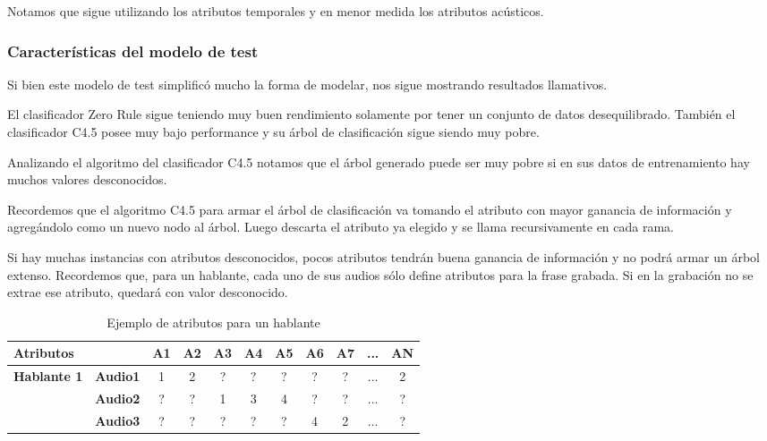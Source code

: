 Notamos que sigue utilizando los atributos temporales y en menor medida los atributos acústicos.


\subsubsection{Características del modelo de test}

Si bien este modelo de test simplificó mucho la forma de modelar, nos sigue mostrando resultados llamativos. 

El clasificador Zero Rule sigue teniendo muy buen rendimiento solamente por tener un conjunto de datos desequilibrado. También el clasificador C4.5 posee muy bajo performance y su árbol de clasificación sigue siendo muy pobre.  

Analizando el algoritmo del clasificador C4.5 notamos que el árbol generado puede ser muy pobre si en sus datos de entrenamiento hay muchos valores desconocidos. 

Recordemos que el algoritmo C4.5 para armar el árbol de clasificación va tomando el atributo con mayor ganancia de información y agregándolo como un nuevo nodo al árbol. Luego descarta el atributo ya elegido y se llama recursivamente en cada rama. 

Si hay muchas instancias con atributos desconocidos, pocos atributos tendrán buena ganancia de información y no podrá armar un árbol extenso. Recordemos que, para un hablante, cada uno de sus audios sólo define atributos para la frase grabada. Si en la grabación no se extrae ese atributo, quedará con valor desconocido. 

\begin{table}[H]
	\centering
	\begin{tabular}{|l|l|ccccccccc|}
		\hline
		\multicolumn{2}{|l|}{Atributos} & A1 & A2 & A3 & A4 & A5 & A6 & A7 & ... & AN \\
		\hline 
		\textbf{Hablante 1} & \textbf{Audio1} & 1 & 2 & ? & ? & ? & ? & ? & ... & 2 \\
		& \textbf{Audio2} & ? & ? & 1 & 3 & 4 & ? & ? & ... & ? \\
		& \textbf{Audio3} & ? & ? & ? & ? & ? & 4 & 2 &  ... & ? \\
		\hline
	\end{tabular}
	\caption{Ejemplo de atributos para un hablante}
	\label{HPTDT_hablante_ej}
\end{table}

